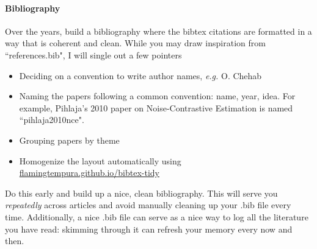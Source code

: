 \paragraph{Bibliography} Over the years, build a bibliography where the bibtex citations are formatted in a way that is coherent and clean. While you may draw inspiration from ``references.bib", I will single out a few pointers
%
\begin{itemize}

    \item Deciding on a convention to write author names, \textit{e.g.} O. Chehab

    \item Naming the papers following a common convention: name, year, idea. For example, Pihlaja's 2010 paper on Noise-Contrastive Estimation is named ``pihlaja2010nce". 

    \item Grouping papers by theme

    \item Homogenize the layout automatically using \\ \url{flamingtempura.github.io/bibtex-tidy}

\end{itemize}
%
Do this early and build up a nice, clean bibliography. This will serve you \textit{repeatedly} across articles and avoid manually cleaning up your .bib file every time. Additionally, a nice .bib file can serve as a nice way to log all the literature you have read: skimming through it can refresh your memory every now and then.